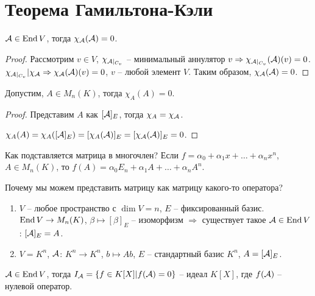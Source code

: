 \documentclass[main]{subfiles}
\begin{document}
\chapter{Теорема Гамильтона-Кэли}

\begin{theorem}
    $\mathcal{A} \in \operatorname{End} V$, тогда $\chi_{\mathcal{A}}(\mathcal{A}) = 0$.
\end{theorem}

\begin{proof}
    Рассмотрим $v \in V$, $\chi_{\mathcal{A} |_{C_v}}$ -- минимальный аннулятор $v \Rightarrow \chi_{\mathcal{A} |_{C_v}}(\mathcal{A})(v) = 0$.
    $\chi_{\mathcal{A} |_{C_v}} | \chi_{\mathcal{A}} \Rightarrow \chi_{\mathcal{A}} (\mathcal{A})(v) = 0$,
    $v$ -- любой элемент $V$. Таким образом, $\chi_{\mathcal{A}}(\mathcal{A}) = 0$.
\end{proof}

\begin{corollary} 
    Допустим, $A \in M_n(K)$, тогда $\chi_A(A)=0$.
\end{corollary}

\begin{proof}
    Представим $A$ как $[\mathcal{A}]_E$, тогда $\chi_A = \chi_{\mathcal{A}}$.

    $\chi_A (A) = \chi_A ([\mathcal{A}]_E) = [\chi_A(\mathcal{A})]_E =[\chi_{\mathcal{A}}(\mathcal{A})]_E = 0$.
\end{proof}

Как подставляется матрица в многочлен? Если $f = \alpha_0 + \alpha_1 x + \ldots + \alpha_n x^n$, $A \in M_n(K)$, то
$f(A) = \alpha_0 E_n + \alpha_1 A + \ldots + \alpha_n A^n$.

Почему мы можем представить матрицу как матрицу какого-то оператора?
\begin{enumerate}
    \item $V$ -- любое пространство с $\dim V = n$, $E$ -- фиксированный базис.
          $\operatorname{End} V \rightarrow M_n(K)$, $\beta \mapsto [\beta]_E$ -- изоморфизм $\Rightarrow$ существует такое $\mathcal{A} \in \operatorname{End} V$: $[\mathcal{A}]_E = A$.

    \item $V = K^n$, $\mathcal{A}$: $K^n \rightarrow K^n$, $b \mapsto Ab$, $E$ -- стандартный базис $K^n$, $A = [\mathcal{A}]_E$.
\end{enumerate}

\begin{proposition}
    $\mathcal{A} \in \operatorname{End} V$, тогда $I_{\mathcal{A}} = \{f\in K[X] | f(\mathcal{A}) = 0\}$ -- идеал $K[X]$, где $f(\mathcal{A})$ -- нулевой оператор.
\end{proposition}
\end{document}
